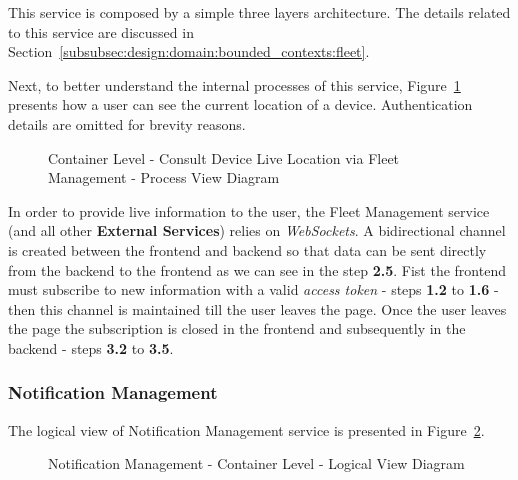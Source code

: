 This service is composed by a simple three layers architecture. The details related to this service are discussed in Section~\ref{subsubsec:design:domain:bounded_contexts:fleet}.

Next, to better understand the internal processes of this service, Figure~\ref{fig:design:architecture:container:process:diagram:fleet} presents how a user can see the current location of a device. Authentication details are omitted for brevity reasons.

\begin{figure}[H]
   \centering
   \resizebox{\columnwidth}{!}
   {
      
   }
   \caption[Container Level - Consult Device Live Location via Fleet Management - Process View Diagram]{Container Level - Consult Device Live Location via Fleet Management - Process View Diagram}
   \label{fig:design:architecture:container:process:diagram:fleet}
\end{figure}

In order to provide live information to the user, the Fleet Management service (and all other \textbf{External Services}) relies on \textit{WebSockets}. A bidirectional channel is created between the frontend and backend so that data can be sent directly from the backend to the frontend as we can see in the step \textbf{2.5}. Fist the frontend must subscribe to new information with a valid \textit{access token} - steps \textbf{1.2} to \textbf{1.6} - then this channel is maintained till the user leaves the page. Once the user leaves the page the subscription is closed in the frontend and subsequently in the backend - steps \textbf{3.2} to \textbf{3.5}.

\subsubsection{Notification Management}
\label{subsubsec:design:architecture:solutions:notification}

The logical view of Notification Management service is presented in Figure~\ref{fig:design:architecture:solutions:containers:logical:noti}.

\begin{figure}[H]
   \centering
   \resizebox{0.8\columnwidth}{!}
       {
       
       }
   \caption[Notification Management - Container Level - Logical View Diagram]{Notification Management - Container Level - Logical View Diagram}
   \label{fig:design:architecture:solutions:containers:logical:noti}
\end{figure}

